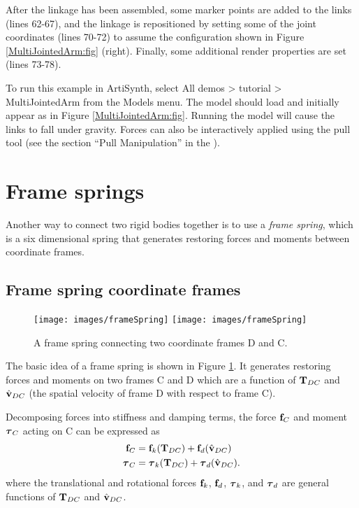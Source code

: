After the linkage has been assembled, some marker points are added to the
links (lines 62-67), and the linkage is repositioned by setting some of the
joint coordinates (lines 70-72) to assume the configuration shown in
Figure \ref{MultiJointedArm:fig} (right). Finally, some
additional render properties are set (lines 73-78).

To run this example in ArtiSynth, select {\sf All demos > tutorial >
MultiJointedArm} from the {\sf Models} menu. The model should load and
initially appear as in Figure \ref{MultiJointedArm:fig}.  Running the model
will cause the links to fall under gravity.  Forces can also be interactively
applied using the pull tool (see the section ``Pull Manipulation'' in the
).

\section{Frame springs}
\label{FrameSprings:sec}

Another way to connect two rigid bodies together is to use a {\it
frame spring}, which is a six dimensional spring that generates
restoring forces and moments between coordinate frames.

\subsection{Frame spring coordinate frames}
\label{FrameSpringCoordinateFrames:sec}

\begin{figure}[ht]
\begin{center}
 \iflatexml
   \texttt{[image: images/frameSpring]}
 \else
   \texttt{[image: images/frameSpring]}
 \fi
\end{center}
\caption{A frame spring connecting two coordinate frames D and C.}
\label{frameSpring:fig}
\end{figure}

The basic idea of a frame spring is shown in Figure
\ref{frameSpring:fig}. It generates restoring forces and moments on
two frames C and D which are a function of ${\bf T}_{DC}$ and $\hat{{\bf v}}_{DC}$
(the spatial velocity of frame D with respect to frame C).

Decomposing forces into stiffness and damping terms, the force
${\bf f}_C$ and moment $\boldsymbol\tau_C$ acting on C can be expressed as 
%
\begin{align}
{\bf f}_C & = {\bf f}_{k} ({\bf T}_{DC}) + {\bf f}_{d} (\hat{{\bf v}}_{DC}) \notag \\
\boldsymbol\tau_C & = \boldsymbol\tau_{k} ({\bf T}_{DC}) + \boldsymbol\tau_{d} (\hat{{\bf v}}_{DC}).
\label{ftauC:eqn}
\end{align}
%
where the translational and rotational forces ${\bf f}_{k}$, ${\bf f}_{d}$,
$\boldsymbol\tau_{k}$, and $\boldsymbol\tau_{d}$ are general functions of ${\bf T}_{DC}$ and
$\hat{{\bf v}}_{DC}$.

